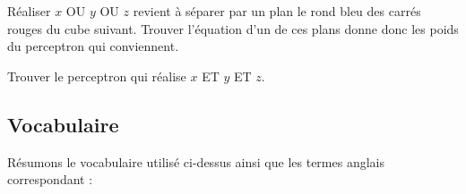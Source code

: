 \begin{exemple}{}{}
	Réaliser \og{}$x$ OU $y$ OU $z$\fg{} revient à séparer par un plan le rond bleu des carrés rouges du cube suivant. Trouver l'équation d'un de ces plans donne donc les poids du perceptron qui conviennent. 
	
	\begin{center}
		\begin{minipage}{0.60\textwidth}
		\end{minipage}
		\begin{minipage}{0.39\textwidth}
		\end{minipage}
	\end{center}
	
\end{exemple}

\begin{exemple}{}{}
	Trouver le perceptron qui réalise  \og{}$x$ ET $y$ ET $z$\fg{}.
	
\end{exemple}




\subsection{Vocabulaire}

Résumons le vocabulaire utilisé ci-dessus ainsi que les termes anglais correspondant :

